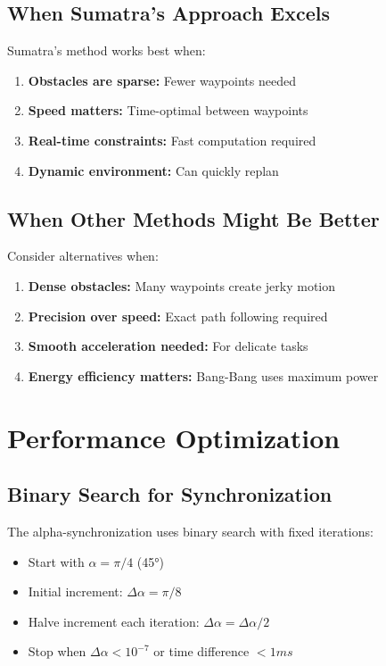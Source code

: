 \documentclass[12pt,a4paper]{article}
\begin{document}
\subsection{When Sumatra's Approach Excels}

Sumatra's method works best when:
\begin{enumerate}
    \item \textbf{Obstacles are sparse:} Fewer waypoints needed
    \item \textbf{Speed matters:} Time-optimal between waypoints
    \item \textbf{Real-time constraints:} Fast computation required
    \item \textbf{Dynamic environment:} Can quickly replan
\end{enumerate}

\subsection{When Other Methods Might Be Better}

Consider alternatives when:
\begin{enumerate}
    \item \textbf{Dense obstacles:} Many waypoints create jerky motion
    \item \textbf{Precision over speed:} Exact path following required
    \item \textbf{Smooth acceleration needed:} For delicate tasks
    \item \textbf{Energy efficiency matters:} Bang-Bang uses maximum power
\end{enumerate}

\section{Performance Optimization}

\subsection{Binary Search for Synchronization}

The alpha-synchronization uses binary search with fixed iterations:
\begin{itemize}
    \item Start with $\alpha = \pi/4$ (45°)
    \item Initial increment: $\Delta\alpha = \pi/8$
    \item Halve increment each iteration: $\Delta\alpha = \Delta\alpha / 2$
    \item Stop when $\Delta\alpha < 10^{-7}$ or time difference $< 1ms$
\end{itemize}
\end{document}
